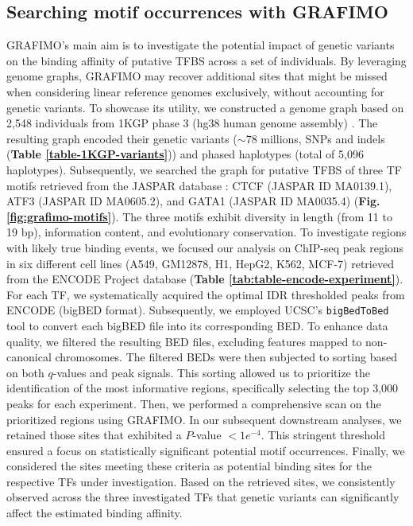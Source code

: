 \documentclass[a4paper, titlepage, openright]{book}
\newcommand{\grafimo}{GRAFIMO\xspace}
\begin{document}
\subsection{Searching motif occurrences with \grafimo}
\grafimo's main aim is to investigate the potential impact of genetic variants on the binding affinity of putative TFBS across a set of individuals. By leveraging genome graphs, \grafimo may recover additional sites that might be missed when considering linear reference genomes exclusively, without accounting for genetic variants. To showcase its utility, we constructed a genome graph based on 2,548 individuals from 1KGP phase 3 (hg38 human genome assembly) \citep{zheng2017alignment, lowy2019variant}. The resulting graph encoded their genetic variants ($\sim$78 millions, SNPs and indels (\textbf{Table 
\ref{table-1KGP-variants}})) and phased haplotypes (total of 5,096 haplotypes). Subsequently, we searched the graph for putative TFBS of three TF motifs retrieved from the JASPAR database \citep{sandelin2004jaspar, fornes2020jaspar}: CTCF (JASPAR ID MA0139.1), ATF3 (JASPAR ID MA0605.2), and GATA1 (JASPAR ID MA0035.4) (\textbf{Fig.\ref{fig:grafimo-motifs}}). The three motifs exhibit diversity in length (from 11 to 19 bp), information content, and evolutionary conservation. To investigate regions with likely true binding events, we focused our analysis on ChIP-seq peak regions in six different cell lines (A549, GM12878, H1, HepG2, K562, MCF-7) retrieved from the ENCODE Project database \citep{encode2012integrated, davis2018encyclopedia} (\textbf{Table \ref{tab:table-encode-experiment}}). For each TF, we systematically acquired the optimal IDR thresholded peaks from ENCODE (bigBED format). Subsequently, we employed UCSC's \texttt{bigBedToBed} tool \citep{kent2010bigwig} to convert each bigBED file into its corresponding BED. To enhance data quality, we filtered the resulting BED files, excluding features mapped to non-canonical chromosomes. The filtered BEDs were then subjected to sorting based on both $q$-values and peak signals. This sorting allowed us to prioritize the identification of the most informative regions, specifically selecting the top 3,000 peaks for each experiment. Then, we performed a comprehensive scan on the prioritized regions using \grafimo. In our subsequent downstream analyses, we retained those sites that exhibited a $P$-value $< 1e^{-4}$. This stringent threshold ensured a focus on statistically significant potential motif occurrences. Finally, we considered the sites meeting these criteria as potential binding sites for the respective TFs under investigation. Based on the retrieved sites, we consistently observed across the three investigated TFs that genetic variants can significantly affect the estimated binding affinity. 
\end{document}
